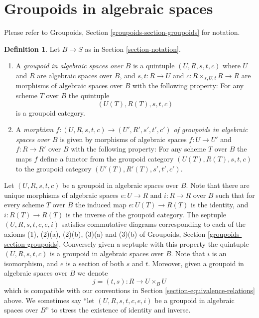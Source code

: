 \documentclass{stacks-project}
\theoremstyle{plain}
\theoremstyle{definition}
\newtheorem{definition}[subsection]{Definition}
\theoremstyle{remark}
\numberwithin{equation}{subsection}
\begin{document}
\section{Groupoids in algebraic spaces}
\label{section-groupoids}

\noindent
Please refer to
Groupoids, Section \ref{groupoids-section-groupoids}
for notation.

\begin{definition}
\label{definition-groupoid}
Let $B \to S$ as in Section \ref{section-notation}.
\begin{enumerate}
\item A {\it groupoid in algebraic spaces over $B$} is a
quintuple $(U, R, s, t, c)$ where
$U$ and $R$ are algebraic spaces over $B$, and
$s, t : R \to U$ and $c : R \times_{s, U, t} R \to R$
are morphisms of algebraic spaces over $B$ with the
following property: For any scheme $T$ over $B$ the quintuple
$$
(U(T), R(T), s, t, c)
$$
is a groupoid category.
\item A {\it morphism
$f : (U, R, s, t, c) \to (U', R', s', t', c')$
of groupoids in algebraic spaces over $B$} is given by morphisms
of algebraic spaces $f : U \to U'$ and $f : R \to R'$ over $B$
with the following property:  For any scheme
$T$ over $B$ the maps $f$ define a functor from the
groupoid category $(U(T), R(T), s, t, c)$ to the
groupoid category $(U'(T), R'(T), s', t', c')$.
\end{enumerate}
\end{definition}

\noindent
Let $(U, R, s, t, c)$ be a groupoid in algebraic spaces over $B$.
Note that there are unique morphisms of algebraic spaces
$e : U \to R$ and $i : R \to R$ over $B$ such that for every scheme $T$
over $B$ the induced map $e : U(T) \to R(T)$ is the identity, and
$i : R(T) \to R(T)$ is the inverse of the groupoid category.
The septuple $(U, R, s, t, c, e, i)$ satisfies commutative diagrams
corresponding to each of the axioms (1), (2)(a), (2)(b), (3)(a) and (3)(b) of
Groupoids, Section \ref{groupoids-section-groupoids}.
Conversely given a septuple with this property the quintuple $(U, R, s, t, c)$
is a groupoid in algebraic spaces over $B$. Note that $i$ is an isomorphism,
and $e$ is a section of both $s$ and $t$.
Moreover, given a groupoid in algebraic spaces over $B$ we denote
$$
j = (t, s) : R \longrightarrow U \times_B U
$$
which is compatible with our conventions in
Section \ref{section-equivalence-relations}
above. We sometimes say ``let $(U, R, s, t, c, e, i)$ be a
groupoid in algebraic spaces over $B$'' to stress the existence of identity and
inverse.
\end{document}
